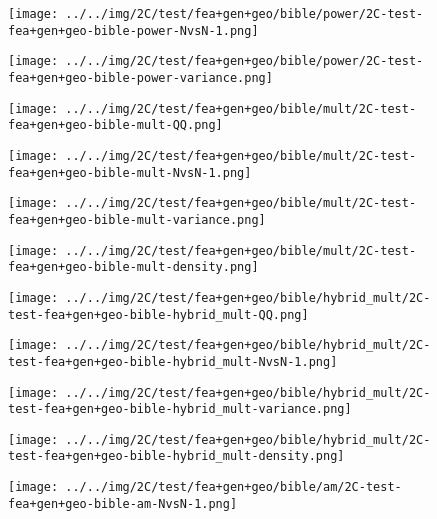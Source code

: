 \begin{figure}[H]
\centering	\texttt{[image: ../../img/2C/test/fea+gen+geo/bible/power/2C-test-fea+gen+geo-bible-power-NvsN-1.png]}
\end{figure}
\begin{figure}[H]
\centering	\texttt{[image: ../../img/2C/test/fea+gen+geo/bible/power/2C-test-fea+gen+geo-bible-power-variance.png]}
\end{figure}
\begin{figure}[H]
\centering	\texttt{[image: ../../img/2C/test/fea+gen+geo/bible/mult/2C-test-fea+gen+geo-bible-mult-QQ.png]}
\end{figure}
\begin{figure}[H]
\centering	\texttt{[image: ../../img/2C/test/fea+gen+geo/bible/mult/2C-test-fea+gen+geo-bible-mult-NvsN-1.png]}
\end{figure}
\begin{figure}[H]
\centering	\texttt{[image: ../../img/2C/test/fea+gen+geo/bible/mult/2C-test-fea+gen+geo-bible-mult-variance.png]}
\end{figure}
\begin{figure}[H]
\centering	\texttt{[image: ../../img/2C/test/fea+gen+geo/bible/mult/2C-test-fea+gen+geo-bible-mult-density.png]}
\end{figure}
\begin{figure}[H]
\centering	\texttt{[image: ../../img/2C/test/fea+gen+geo/bible/hybrid\_mult/2C-test-fea+gen+geo-bible-hybrid\_mult-QQ.png]}
\end{figure}
\begin{figure}[H]
\centering	\texttt{[image: ../../img/2C/test/fea+gen+geo/bible/hybrid\_mult/2C-test-fea+gen+geo-bible-hybrid\_mult-NvsN-1.png]}
\end{figure}
\begin{figure}[H]
\centering	\texttt{[image: ../../img/2C/test/fea+gen+geo/bible/hybrid\_mult/2C-test-fea+gen+geo-bible-hybrid\_mult-variance.png]}
\end{figure}
\begin{figure}[H]
\centering	\texttt{[image: ../../img/2C/test/fea+gen+geo/bible/hybrid\_mult/2C-test-fea+gen+geo-bible-hybrid\_mult-density.png]}
\end{figure}
\begin{figure}[H]
\centering	\texttt{[image: ../../img/2C/test/fea+gen+geo/bible/am/2C-test-fea+gen+geo-bible-am-NvsN-1.png]}
\end{figure}
